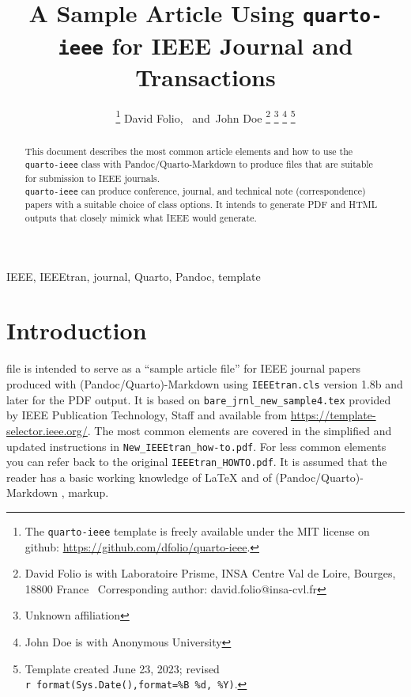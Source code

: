 \documentclass[
  journal,
]{IEEEtran}%
\title{A Sample Article Using \texttt{quarto-ieee} for IEEE Journal and
Transactions}
\author{
\thanks{The \texttt{quarto-ieee} template is freely available under the
MIT license on github: \url{https://github.com/dfolio/quarto-ieee}.}
David Folio\orcidlink{0000-0001-9430-6091},~\IEEEmembership{Member,
IEEE}
and~John Doe%
\thanks{David Folio is with Laboratoire Prisme, INSA Centre Val de
Loire, Bourges, 18800 France%
  Corresponding author: david.folio@insa-cvl.fr
}
\thanks{Unknown affiliation}
\thanks{John Doe is with Anonymous University%
}
\thanks{Template created June 23, 2023; revised
\texttt{r\ format(Sys.Date(),format=\textquotesingle{}\%B\ \%d,\ \%Y\textquotesingle{})}.}
}
\theoremstyle{plain}
\theoremstyle{remark}
\begin{document}


\maketitle

\begin{abstract}
This document describes the most common article elements and how to use
the \texttt{quarto-ieee} class with Pandoc/Quarto-Markdown to produce
files that are suitable for submission to IEEE journals.\\
\texttt{quarto-ieee} can produce conference, journal, and technical note
(correspondence) papers with a suitable choice of class options. It
intends to generate PDF and HTML outputs that closely mimick what IEEE
would generate.
\end{abstract}
\begin{IEEEkeywords}
IEEE, IEEEtran, journal, Quarto, Pandoc, template
\end{IEEEkeywords}

%


\section{Introduction}\label{sec-intro}

 file is intended to serve as a ``sample article
file'' for IEEE journal papers produced with (Pandoc/Quarto)-Markdown
using \texttt{IEEEtran.cls} version 1.8b and later for the PDF output.
It is based on \texttt{bare\_jrnl\_new\_sample4.tex} provided by IEEE
Publication Technology, Staff and available from
\url{https://template-selector.ieee.org/}. The most common elements are
covered in the simplified and updated instructions in
\texttt{New\_IEEEtran\_how-to.pdf}. For less common elements you can
refer back to the original \texttt{IEEEtran\_HOWTO.pdf}. It is assumed
that the reader has a basic working knowledge of {\LaTeX}
 and of
(Pandoc/Quarto)-Markdown ,
 markup.
\end{document}
